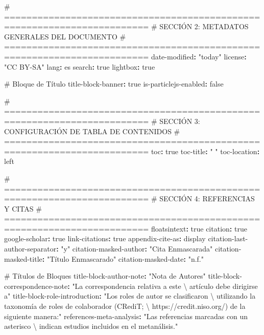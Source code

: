 \documentclass[
  doc,
  floatsintext,
  longtable,
  a4paper,
  nolmodern,
  notxfonts,
  notimes,
  12pt,
  colorlinks=true,linkcolor=blue,citecolor=blue,urlcolor=blue]{apa7}
\newenvironment{Shaded}{\begin{snugshade}}{\end{snugshade}}
\newcommand{\AttributeTok}[1]{\textcolor[rgb]{0.40,0.45,0.13}{#1}}
\newcommand{\CharTok}[1]{\textcolor[rgb]{0.13,0.47,0.30}{#1}}
\newcommand{\CommentTok}[1]{\textcolor[rgb]{0.37,0.37,0.37}{#1}}
\newcommand{\FunctionTok}[1]{\textcolor[rgb]{0.28,0.35,0.67}{#1}}
\newcommand{\KeywordTok}[1]{\textcolor[rgb]{0.00,0.23,0.31}{\textbf{#1}}}
\newcommand{\SpecialCharTok}[1]{\textcolor[rgb]{0.37,0.37,0.37}{#1}}
\newcommand{\StringTok}[1]{\textcolor[rgb]{0.13,0.47,0.30}{#1}}
\begin{document}
\begin{Shaded}
\begin{Highlighting}[]
\CommentTok{\# ========================================================================}
\CommentTok{\# SECCIÓN 2: METADATOS GENERALES DEL DOCUMENTO}
\CommentTok{\# ========================================================================}
\FunctionTok{date{-}modified}\KeywordTok{:}\AttributeTok{ }\StringTok{"today"}
\FunctionTok{license}\KeywordTok{:}\AttributeTok{ }\StringTok{"CC BY{-}SA"}
\FunctionTok{lang}\KeywordTok{:}\AttributeTok{ es}
\FunctionTok{search}\KeywordTok{:}\AttributeTok{ }\CharTok{true}
\FunctionTok{lightbox}\KeywordTok{:}\AttributeTok{ }\CharTok{true}

\CommentTok{\# Bloque de Título}
\FunctionTok{title{-}block{-}banner}\KeywordTok{:}\AttributeTok{ }\CharTok{true}
\FunctionTok{is{-}particlejs{-}enabled}\KeywordTok{:}\AttributeTok{ }\CharTok{false}

\CommentTok{\# ========================================================================}
\CommentTok{\# SECCIÓN 3: CONFIGURACIÓN DE TABLA DE CONTENIDOS}
\CommentTok{\# ========================================================================}
\FunctionTok{toc}\KeywordTok{:}\AttributeTok{ }\CharTok{true}
\FunctionTok{toc{-}title}\KeywordTok{:}\AttributeTok{ }\StringTok{" "}
\FunctionTok{toc{-}location}\KeywordTok{:}\AttributeTok{ left}

\CommentTok{\# ========================================================================}
\CommentTok{\# SECCIÓN 4: REFERENCIAS Y CITAS}
\CommentTok{\# ========================================================================}
\FunctionTok{floatsintext}\KeywordTok{:}\AttributeTok{ }\CharTok{true}
\FunctionTok{citation}\KeywordTok{:}\AttributeTok{ }\CharTok{true}
\FunctionTok{google{-}scholar}\KeywordTok{:}\AttributeTok{ }\CharTok{true}
\FunctionTok{link{-}citations}\KeywordTok{:}\AttributeTok{ }\CharTok{true}
\FunctionTok{appendix{-}cite{-}as}\KeywordTok{:}\AttributeTok{ display}
\FunctionTok{citation{-}last{-}author{-}separator}\KeywordTok{:}\AttributeTok{ }\StringTok{"y"}
\FunctionTok{citation{-}masked{-}author}\KeywordTok{:}\AttributeTok{ }\StringTok{"Cita Enmascarada"}
\FunctionTok{citation{-}masked{-}title}\KeywordTok{:}\AttributeTok{ }\StringTok{"Título Enmascarado"}
\FunctionTok{citation{-}masked{-}date}\KeywordTok{:}\AttributeTok{ }\StringTok{"n.f."}

\CommentTok{\# Títulos de Bloques}
\FunctionTok{title{-}block{-}author{-}note}\KeywordTok{:}\AttributeTok{ }\StringTok{"Nota de Autores"}
\FunctionTok{title{-}block{-}correspondence{-}note}\KeywordTok{:}\AttributeTok{ }\StringTok{"La correspondencia relativa a este  }\SpecialCharTok{\textbackslash{} }
\StringTok{artículo debe dirigirse a"}
\FunctionTok{title{-}block{-}role{-}introduction}\KeywordTok{:}\AttributeTok{ }\StringTok{"Los roles de autor se clasificaron    }\SpecialCharTok{\textbackslash{} }
\StringTok{utilizando la taxonomía de roles de colaborador (CRediT;              }\SpecialCharTok{\textbackslash{} }
\StringTok{https://credit.niso.org/) de la siguiente manera:"}
\FunctionTok{references{-}meta{-}analysis}\KeywordTok{:}\AttributeTok{ }\StringTok{"Las referencias marcadas con un asterisco  }\SpecialCharTok{\textbackslash{} }
\StringTok{indican estudios incluidos en el metanálisis."}


\end{Highlighting}
\end{Shaded}
\end{document}
